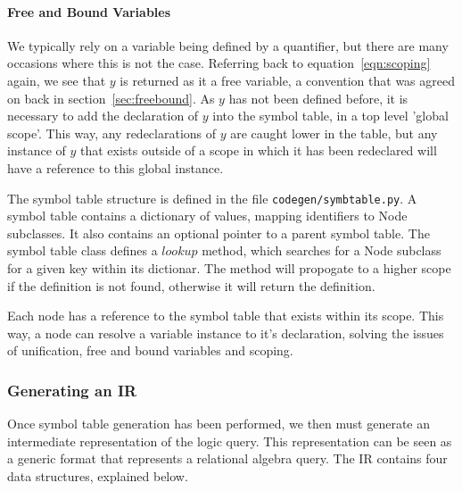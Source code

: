 \documentclass[a4paper, 11pt]{article}
\begin{document}
      \paragraph{Free and Bound Variables}
        We typically rely on a variable being defined by a quantifier, but
        there are many occasions where this is not the case. Referring back to
        equation~\ref{eqn:scoping} again, we see that $y$ is returned as it a
        free variable, a convention that was agreed on back in
        section~\ref{sec:freebound}. As $y$ has not been defined before, it is
        necessary to add the declaration of $y$ into the symbol table, in a top
        level 'global scope'. This way, any redeclarations of $y$ are caught
        lower in the table, but any instance of $y$ that exists outside of a
        scope in which it has been redeclared will have a reference to this
        global instance.

      The symbol table structure is defined in the file
      \texttt{codegen/symbtable.py}. A symbol table contains a dictionary of
      values, mapping identifiers to Node subclasses. It also contains an
      optional pointer to a parent symbol table. The symbol table class defines
      a $lookup$ method, which searches for a Node subclass for a given key
      within its dictionar. The method will propogate to a higher scope if the
      definition is not found, otherwise it will return the definition.

      Each node has a reference to the symbol table that exists within its
      scope. This way, a node can resolve a variable instance to it's
      declaration, solving the issues of unification, free and bound variables
      and scoping.

    \subsubsection{Generating an IR}

      Once symbol table generation has been performed, we then must generate an
      intermediate representation of the logic query. This representation can
      be seen as a generic format that represents a relational algebra
      query. The IR contains four data structures, explained below.
\end{document}
